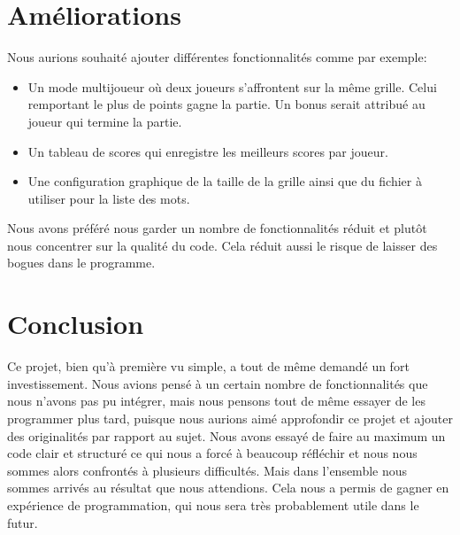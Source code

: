 \documentclass{article}
\begin{document}
\section{Améliorations}

Nous aurions souhaité ajouter différentes fonctionnalités comme par exemple:
\begin{itemize}
  \item Un mode multijoueur où deux joueurs s'affrontent sur la même grille. Celui remportant le plus de points gagne la partie. Un bonus serait attribué au joueur qui termine la partie.
  \item Un tableau de scores qui enregistre les meilleurs scores par joueur.
  \item Une configuration graphique de la taille de la grille ainsi que du fichier à utiliser pour la liste des mots.
\end{itemize}
Nous avons préféré nous garder un nombre de fonctionnalités réduit et plutôt nous concentrer sur la qualité du code. Cela réduit aussi le risque de laisser des bogues dans le programme.

\section{Conclusion}
Ce projet, bien qu'à première vu simple, a tout de même demandé un fort investissement. Nous avions pensé à un certain nombre de fonctionnalités que nous n'avons pas pu intégrer, mais nous pensons tout de même essayer de les programmer plus tard, puisque nous aurions aimé approfondir ce projet et ajouter des originalités par rapport au sujet. Nous avons essayé de faire au maximum un code clair et structuré ce qui nous a forcé à beaucoup réfléchir et nous nous sommes alors confrontés à plusieurs difficultés. Mais dans l'ensemble nous sommes arrivés au résultat que nous attendions. Cela nous a permis de gagner en expérience de programmation, qui nous sera très probablement utile dans le futur.
\end{document}
